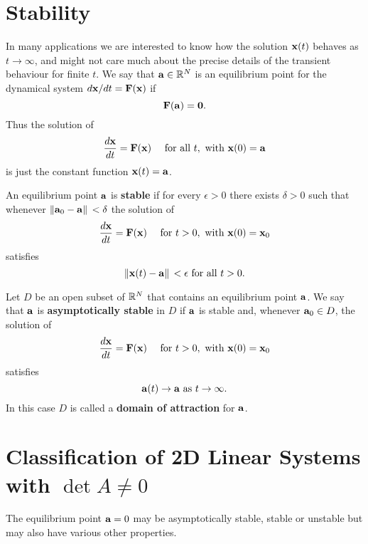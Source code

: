 \section{Stability}
In many applications we are interested to know how the solution \(\mathbf{x}(t)\) behaves as \(t \to \infty\), and might not care much about the precise details of the transient behaviour for finite \(t\).
We say that \(\mathbf{a} \in \mathbb{R}^N\) is an equilibrium point for the dynamical system \(d \mathbf{x} / dt = \mathbf{F}(\mathbf{x})\) if
\[\mathbf{F}(\mathbf{a}) = \mathbf{0}.\]
Thus the solution of
\[\frac{d\mathbf{x}}{dt} = \mathbf{F}(\mathbf{x}) \quad  \text{ for all } t, \text{ with } \mathbf{x}(0) = \mathbf{a}\]
is just the constant function \(\mathbf{x}(t) = \mathbf{a}\).

An equilibrium point \(\mathbf{a}\) is \textbf{stable} if for every \(\epsilon > 0\) there exists \(\delta > 0\) such that whenever \(\norm*{\mathbf{a}_0 - \mathbf{a}} <\delta\) the solution of
\[\frac{d \mathbf{x}}{dt} = \mathbf{F}(\mathbf{x}) \quad  \text{ for } t > 0,  \text{ with } \mathbf{x}(0) = \mathbf{x}_0\]
satisfies
\[\norm*{\mathbf{x}(t) - \mathbf{a}} < \epsilon  \text{ for all } t > 0.\]

Let \(D\) be an open subset of \(\mathbb{R}^N\) that contains an equilibrium point \(\mathbf{a}\). We say that \(\mathbf{a}\) is \textbf{asymptotically stable} in \(D\) if \(\mathbf{a}\) is stable and, whenever \(\mathbf{a}_0 \in D\), the solution of
\[\frac{d \mathbf{x}}{dt} = \mathbf{F}(\mathbf{x}) \quad  \text{ for } t > 0, \text{ with } \mathbf{x}(0) = \mathbf{x}_0\]
satisfies
\[\mathbf{a}(t) \to \mathbf{a}  \text{ as } t \to \infty.\]
In this case \(D\) is called a \textbf{domain of attraction} for \(\mathbf{a}\).


\section{Classification of 2D Linear Systems with \(\det A \neq 0\)}
The equilibrium point \(\mathbf{a} = 0\) may be asymptotically stable, stable or unstable but may also have various other properties.

